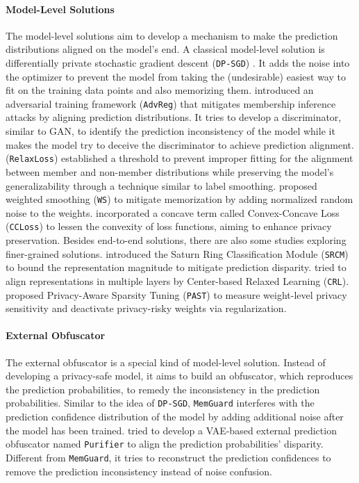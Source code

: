\paragraph{Model-Level Solutions}
The model-level solutions aim to develop a mechanism to make the prediction distributions aligned on the model's end. 
A classical model-level solution is differentially private stochastic gradient descent (\texttt{DP-SGD}) \cite{abadi2016dpsgd}. It adds the noise into the optimizer to prevent the model from taking the (undesirable) easiest way to fit on the training data points and also memorizing them.
\cite{nasr2018advreg} introduced an adversarial training framework (\texttt{AdvReg}) that mitigates membership inference attacks by aligning prediction distributions. It tries to develop a discriminator, similar to GAN, to identify the prediction inconsistency of the model while it makes the model try to deceive the discriminator to achieve prediction alignment.
\cite{chen2022relaxloss} (\texttt{RelaxLoss}) established a threshold to prevent improper fitting for the alignment between member and non-member distributions while preserving the model's generalizability through a technique similar to label smoothing.
\cite{tan2023ws} proposed weighted smoothing (\texttt{WS}) to mitigate memorization by adding normalized random noise to the weights.
\cite{liu2024ccloss} incorporated a concave term called Convex-Concave Loss (\texttt{CCLoss}) to lessen the convexity of loss functions, aiming to enhance privacy preservation.
Besides end-to-end solutions, there are also some studies exploring finer-grained solutions.
\cite{fang2024representation} introduced the Saturn Ring Classification Module (\texttt{SRCM}) to bound the representation magnitude to mitigate prediction disparity.
\cite{fang2024crl} tried to align representations in multiple layers by Center-based Relaxed Learning (\texttt{CRL}).
\cite{hu2024past} proposed Privacy-Aware Sparsity Tuning (\texttt{PAST}) to measure weight-level privacy sensitivity and deactivate privacy-risky weights via regularization. 



\paragraph{External Obfuscator}
The external obfuscator is a special kind of model-level solution. Instead of developing a privacy-safe model, it aims to build an obfuscator, which reproduces the prediction probabilities, to remedy the inconsistency in the prediction probabilities.
Similar to the idea of \texttt{DP-SGD}, \texttt{MemGuard} \cite{jia2019memguard} interferes with the prediction confidence distribution of the model by adding additional noise after the model has been trained. 
\cite{yang2023purifier} tried to develop a VAE-based external prediction obfuscator named \texttt{Purifier} to align the prediction probabilities' disparity. Different from \texttt{MemGuard}, it tries to reconstruct the prediction confidences to remove the prediction inconsistency instead of noise confusion.


